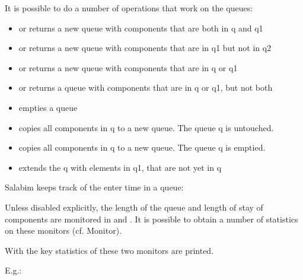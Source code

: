 \documentclass[letterpaper,10pt,english]{sphinxmanual}
\begin{document}
It is possible to do a number of operations that work on the queues:
\begin{itemize}
\item {} 
 or  returns a new queue with components that are both in q and q1

\item {} 
 or  returns a new queue with components that are in q1 but not in q2

\item {} 
 or  returns a new queue with components that are in q or q1

\item {} 
 or  returns a queue with components that are in q or q1, but not both

\item {} 
 empties a queue

\item {} 
 copies all components in q to a new queue. The queue q is untouched.

\item {} 
 copies all components in q to a new queue. The queue q is emptied.

\item {} 
 extends the q with elements in q1, that are not yet in q

\end{itemize}

Salabim keeps track of the enter time in a queue: 

Unless disabled explicitly, the length of the queue and length of stay of components are monitored in
 and . It is possible to obtain a number of statistics on these monitors (cf. Monitor).

With  the key statistics of these two monitors are printed.

E.g.:
\end{document}
